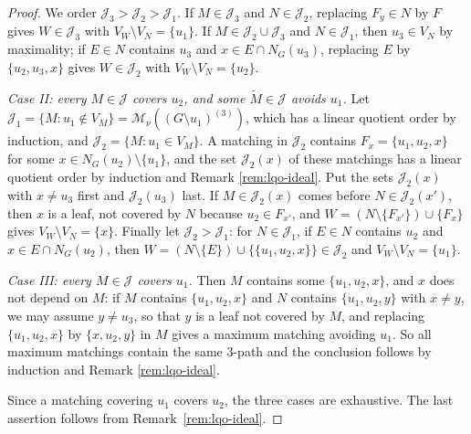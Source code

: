 \documentclass{amsart}
\theoremstyle{definition}
\newtheorem{Conjecture}[Theorem]{Conjecture}
\theoremstyle{remark}
\begin{document}
\begin{proof}
We order $\mathcal J_3>\mathcal J_2>\mathcal J_1$. If $M\in\mathcal J_3$ and $N\in\mathcal J_2$, replacing $F_y\in N$ by $F$ gives $W\in\mathcal J_3$ with $V_W\setminus V_N=\{u_1\}$. If $M\in\mathcal J_2\cup\mathcal J_3$ and $N\in\mathcal J_1$, then $u_3\in V_N$ by maximality; if $E\in N$ contains $u_3$ and $x\in E\cap N_G(u_3)$, replacing $E$ by $\{u_2,u_3,x\}$ gives $W\in\mathcal J_2$ with $V_W\setminus V_N=\{u_2\}$.

\emph{Case II: every $M\in\mathcal J$ covers $u_2$, and some $\widetilde M\in\mathcal J$ avoids $u_1$.} Let $\mathcal J_1=\{M:u_1\notin V_M\}=\mathcal M_\nu((G\setminus u_1)^{(3)})$, which has a linear quotient order by induction, and $\mathcal J_2=\{M:u_1\in V_M\}$. A matching in $\mathcal J_2$ contains $F_x=\{u_1,u_2,x\}$ for some $x\in N_G(u_2)\setminus\{u_1\}$, and the set $\mathcal J_2(x)$ of these matchings has a linear quotient order by induction and Remark \ref{rem:lqo-ideal}. Put the sets $\mathcal J_2(x)$ with $x\neq u_3$ first and $\mathcal J_2(u_3)$ last. If $M\in\mathcal J_2(x)$ comes before $N\in\mathcal J_2(x')$, then $x$ is a leaf, not covered by $N$ because $u_2\in F_{x'}$, and $W=(N\setminus\{F_{x'}\})\cup\{F_x\}$ gives $V_W\setminus V_N=\{x\}$. Finally let $\mathcal J_2>\mathcal J_1$: for $N\in\mathcal J_1$, if $E\in N$ contains $u_2$ and $x\in E\cap N_G(u_2)$, then $W=(N\setminus\{E\})\cup\{\{u_1,u_2,x\}\}\in\mathcal J_2$ and $V_W\setminus V_N=\{u_1\}$.

\emph{Case III: every $M\in\mathcal J$ covers $u_1$.} Then $M$ contains some $\{u_1,u_2,x\}$, and $x$ does not depend on $M$: if $M$ contains $\{u_1,u_2,x\}$ and $N$ contains $\{u_1,u_2,y\}$ with $x\neq y$, we may assume $y\neq u_3$, so that $y$ is a leaf not covered by $M$, and replacing $\{u_1,u_2,x\}$ by $\{x,u_2,y\}$ in $M$ gives a maximum matching avoiding $u_1$. So all maximum matchings contain the same $3$-path and the conclusion follows by induction and Remark \ref{rem:lqo-ideal}.

Since a matching covering $u_1$ covers $u_2$, the three cases are exhaustive. The last assertion follows from Remark~\ref{rem:lqo-ideal}.
\end{proof}


\end{document}
